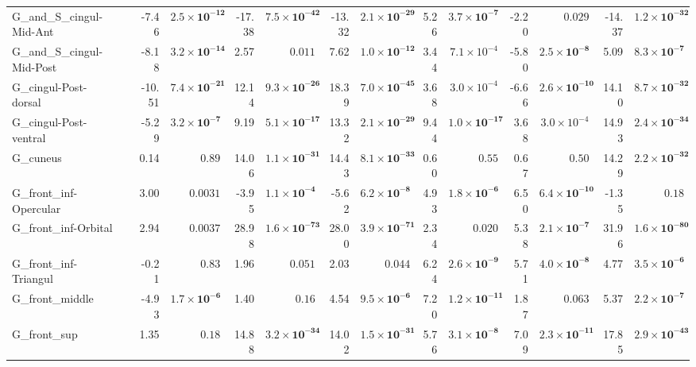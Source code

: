 {\begin{longtable}{llrrrrrrrrrrrr}
G\_and\_S\_cingul-Mid-Ant &  & -7.46 & $\mathbf{2.5{\times}10^{-12}}$ & -17.38 & $\mathbf{7.5{\times}10^{-42}}$ & -13.32 & $\mathbf{2.1{\times}10^{-29}}$ & 5.26 & $\mathbf{3.7{\times}10^{-7}}$ & -2.20 & $0.029$ & -14.37 & $\mathbf{1.2{\times}10^{-32}}$ \\
G\_and\_S\_cingul-Mid-Post &  & -8.18 & $\mathbf{3.2{\times}10^{-14}}$ & 2.57 & $0.011$ & 7.62 & $\mathbf{1.0{\times}10^{-12}}$ & 3.44 & $7.1{\times}10^{-4}$ & -5.80 & $\mathbf{2.5{\times}10^{-8}}$ & 5.09 & $\mathbf{8.3{\times}10^{-7}}$ \\
G\_cingul-Post-dorsal &  & -10.51 & $\mathbf{7.4{\times}10^{-21}}$ & 12.14 & $\mathbf{9.3{\times}10^{-26}}$ & 18.39 & $\mathbf{7.0{\times}10^{-45}}$ & 3.68 & $3.0{\times}10^{-4}$ & -6.66 & $\mathbf{2.6{\times}10^{-10}}$ & 14.10 & $\mathbf{8.7{\times}10^{-32}}$ \\
G\_cingul-Post-ventral &  & -5.29 & $\mathbf{3.2{\times}10^{-7}}$ & 9.19 & $\mathbf{5.1{\times}10^{-17}}$ & 13.32 & $\mathbf{2.1{\times}10^{-29}}$ & 9.44 & $\mathbf{1.0{\times}10^{-17}}$ & 3.68 & $3.0{\times}10^{-4}$ & 14.93 & $\mathbf{2.4{\times}10^{-34}}$ \\
G\_cuneus &  & 0.14 & $0.89$ & 14.06 & $\mathbf{1.1{\times}10^{-31}}$ & 14.43 & $\mathbf{8.1{\times}10^{-33}}$ & 0.60 & $0.55$ & 0.67 & $0.50$ & 14.29 & $\mathbf{2.2{\times}10^{-32}}$ \\
G\_front\_inf-Opercular &  & 3.00 & $0.0031$ & -3.95 & $\mathbf{1.1{\times}10^{-4}}$ & -5.62 & $\mathbf{6.2{\times}10^{-8}}$ & 4.93 & $\mathbf{1.8{\times}10^{-6}}$ & 6.50 & $\mathbf{6.4{\times}10^{-10}}$ & -1.35 & $0.18$ \\
G\_front\_inf-Orbital &  & 2.94 & $0.0037$ & 28.98 & $\mathbf{1.6{\times}10^{-73}}$ & 28.00 & $\mathbf{3.9{\times}10^{-71}}$ & 2.34 & $0.020$ & 5.38 & $\mathbf{2.1{\times}10^{-7}}$ & 31.96 & $\mathbf{1.6{\times}10^{-80}}$ \\
G\_front\_inf-Triangul &  & -0.21 & $0.83$ & 1.96 & $0.051$ & 2.03 & $0.044$ & 6.24 & $\mathbf{2.6{\times}10^{-9}}$ & 5.71 & $\mathbf{4.0{\times}10^{-8}}$ & 4.77 & $\mathbf{3.5{\times}10^{-6}}$ \\
G\_front\_middle &  & -4.93 & $\mathbf{1.7{\times}10^{-6}}$ & 1.40 & $0.16$ & 4.54 & $\mathbf{9.5{\times}10^{-6}}$ & 7.20 & $\mathbf{1.2{\times}10^{-11}}$ & 1.87 & $0.063$ & 5.37 & $\mathbf{2.2{\times}10^{-7}}$ \\
G\_front\_sup &  & 1.35 & $0.18$ & 14.88 & $\mathbf{3.2{\times}10^{-34}}$ & 14.02 & $\mathbf{1.5{\times}10^{-31}}$ & 5.76 & $\mathbf{3.1{\times}10^{-8}}$ & 7.09 & $\mathbf{2.3{\times}10^{-11}}$ & 17.85 & $\mathbf{2.9{\times}10^{-43}}$ \\

\end{longtable}}
